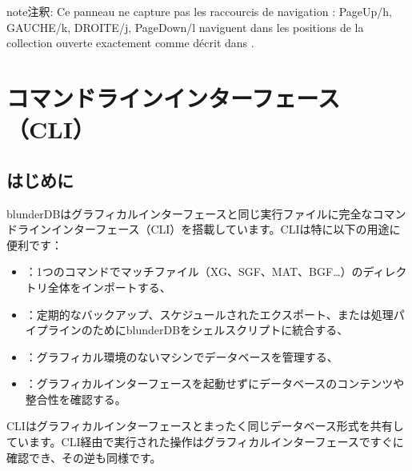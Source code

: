 \documentclass[letterpaper,10pt,dvipdfmx]{sphinxmanual}
\begin{document}
\begin{sphinxadmonition}{note}{注釈:}
\sphinxAtStartPar
Ce panneau ne capture pas les raccourcis de navigation :
PageUp/h, GAUCHE/k, DROITE/j, PageDown/l naviguent dans les positions de
la collection ouverte exactement comme décrit dans
{\hyperref[\detokenize{raccourcis:raccourcis-navigation}]{}}.
\end{sphinxadmonition}

\sphinxstepscope


\section{コマンドラインインターフェース（CLI）}
\label{\detokenize{cli:interface-en-ligne-de-commande-cli}}\label{\detokenize{cli:cli}}\label{\detokenize{cli::doc}}

\subsection{はじめに}
\label{\detokenize{cli:introduction}}
\sphinxAtStartPar
blunderDBはグラフィカルインターフェースと同じ実行ファイルに完全なコマンドラインインターフェース（CLI）を搭載しています。CLIは特に以下の用途に便利です：
\begin{itemize}
\item {} 
\sphinxAtStartPar
{}：1つのコマンドでマッチファイル（XG、SGF、MAT、BGF…）のディレクトリ全体をインポートする、

\item {} 
\sphinxAtStartPar
{}：定期的なバックアップ、スケジュールされたエクスポート、または処理パイプラインのためにblunderDBをシェルスクリプトに統合する、

\item {} 
\sphinxAtStartPar
{}：グラフィカル環境のないマシンでデータベースを管理する、

\item {} 
\sphinxAtStartPar
{}：グラフィカルインターフェースを起動せずにデータベースのコンテンツや整合性を確認する。

\end{itemize}

\sphinxAtStartPar
CLIはグラフィカルインターフェースとまったく同じデータベース形式を共有しています。CLI経由で実行された操作はグラフィカルインターフェースですぐに確認でき、その逆も同様です。
\end{document}
